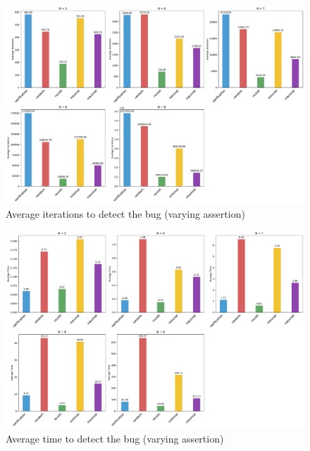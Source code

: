 \begin{figure}[h!tbp]
	\centering
	\includegraphics[scale=0.3]{figure/long-assert/fuzz_iter.pdf}
	\caption{Average iterations to detect the bug (varying assertion)}
	\label{long-assert-N-iter}
\end{figure}


\begin{figure}[h!tbp]
	\centering
	\includegraphics[scale=0.3]{figure/long-assert/fuzz_time.pdf}
	\caption{Average time to detect the bug (varying assertion)}
	\label{long-assert-N-time}
\end{figure}